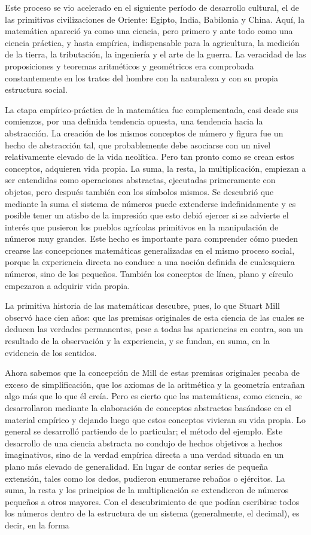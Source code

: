 \documentclass[a4paper, 12pt]{article}
\begin{document}
Este proceso se vio acelerado en el siguiente período de desarrollo cultural, el
de las primitivas civilizaciones de Oriente: Egipto, India, Babilonia y China.
Aquí, la matemática apareció ya como una ciencia, pero primero y ante todo como
una ciencia práctica, y hasta empírica, indispensable para la agricultura, la
medición de la tierra, la tributación, la ingeniería y el arte de la guerra. La
veracidad de las proposiciones y teoremas aritméticos y geométricos era
comprobada constantemente en los tratos del hombre con la naturaleza y con su
propia estructura social.

La etapa empírico-práctica de la matemática fue complementada, casi desde sus
comienzos, por una definida tendencia opuesta, una tendencia hacia la
abstracción. La creación de los mismos conceptos de número y figura fue un hecho
de abstracción tal, que probablemente debe asociarse con un nivel relativamente
elevado de la vida neolítica. Pero tan pronto como se crean estos conceptos,
adquieren vida propia. La suma, la resta, la multiplicación, empiezan a ser
entendidas como operaciones abstractas, ejecutadas primeramente con objetos,
pero después también con los símbolos mismos. Se descubrió que mediante la suma
el sistema de números puede extenderse indefinidamente y es posible tener un
atisbo de la impresión que esto debió ejercer si se advierte el interés que
pusieron los pueblos agrícolas primitivos en la manipulación de números muy
grandes. Este hecho es importante para comprender cómo pueden crearse las
concepciones matemáticas generalizadas en el mismo proceso social, porque la
experiencia directa no conduce a una noción definida de cualesquiera números,
sino de los pequeños. También los conceptos de línea, plano y círculo empezaron
a adquirir vida propia.

La primitiva historia de las matemáticas descubre, pues, lo que Stuart Mill
observó hace cien años: que las premisas originales de esta ciencia de las
cuales se deducen las verdades permanentes, pese a todas las apariencias en
contra, son un resultado de la observación y la experiencia, y se fundan, en
suma, en la evidencia de los sentidos.

Ahora sabemos que la concepción de Mill de estas premisas originales pecaba de
exceso de simplificación, que los axiomas de la aritmética y la geometría
entrañan algo más que lo que él creía. Pero es cierto que las matemáticas, como
ciencia, se desarrollaron mediante la elaboración de conceptos abstractos
basándose en el material empírico y dejando luego que estos conceptos vivieran
su vida propia. Lo general se desarrolló partiendo de lo particular; el método
del ejemplo. Este desarrollo de una ciencia abstracta no condujo de hechos
objetivos a hechos imaginativos, sino de la verdad empírica directa a una verdad
situada en un plano más elevado de generalidad. En lugar de contar series de
pequeña extensión, tales como los dedos, pudieron enumerarse rebaños o
ejércitos. La suma, la resta y los principios de la multiplicación se
extendieron de números pequeños a otros mayores. Con el descubrimiento de que
podían escribirse todos los números dentro de la estructura de un sistema
(generalmente, el decimal), es decir, en la forma
\end{document}
